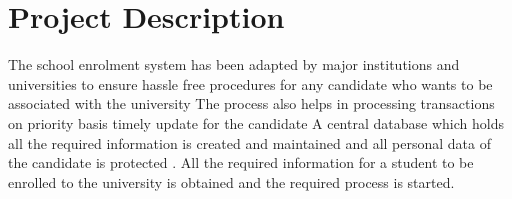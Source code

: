 \section{Project Description}
The school enrolment system has been adapted by major institutions and universities to ensure hassle free procedures for any candidate who wants to be associated with the university
The process also helps in processing transactions on priority basis timely update for the candidate
A central database which holds all the required information is created and maintained and all personal data of the candidate is protected .
All the required information for a student to be enrolled to the university is obtained and the required process is started.


